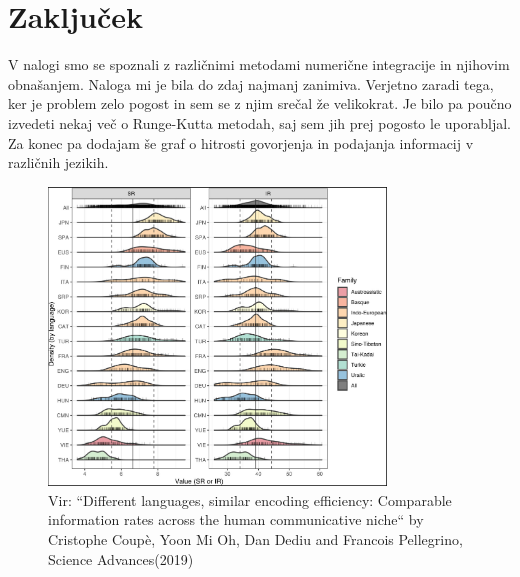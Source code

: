 \documentclass{article}
\begin{document}
\section{Zaključek}
V nalogi smo se spoznali z različnimi metodami numerične integracije in njihovim obnašanjem. Naloga mi je bila do zdaj najmanj zanimiva. Verjetno zaradi tega, ker je problem zelo pogost in sem se z njim srečal že velikokrat. Je bilo pa poučno izvedeti nekaj več o Runge-Kutta metodah, saj sem jih prej pogosto le uporabljal. Za konec pa dodajam še graf o hitrosti govorjenja in podajanja informacij v različnih jezikih.
\begin{figure}[H]
    \centering
    \includegraphics[width=0.8\textwidth]{languages.png}
	\caption{Vir: ``Different languages, similar encoding efficiency: Comparable information rates across the human communicative niche`` by Cristophe Coupè, Yoon Mi Oh, Dan Dediu and Francois Pellegrino, Science Advances(2019)}
    \label{fig:image_label}
\end{figure}
\end{document}
